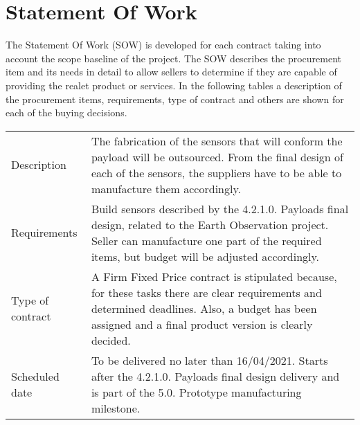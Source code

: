 \section{Statement Of Work}
The Statement Of Work (SOW) is developed for each contract taking into account the scope baseline of the project. The SOW describes the procurement item and its needs in detail to allow sellers to determine if they are capable of providing the realet product or services.
In the following tables a description of the procurement items, requirements, type of contract and others are shown for each of the buying decisions.
\begin{table}[H]
	\centering
	\begin{tabular}{>{\raggedright\arraybackslash}p{3cm} >{\arraybackslash}p{11cm}}
		
		\toprule[2pt]
		
		\multicolumn{2}{c}{\textbf{SOW - 5.1.1. Manufacturing of payload sensors}}\\
		
		\midrule[1.5pt]
		
		Description & The fabrication of the sensors that will conform the payload will be outsourced. From the final design of each of the sensors, the suppliers have to be able to manufacture them accordingly.\vspace{0.2cm} \\
		
		\midrule
		
		Requirements & Build sensors described by the 4.2.1.0. Payloads final design, related to the Earth Observation project. Seller can manufacture one part of the required items, but budget will be adjusted accordingly.\vspace{0.2cm} \\
		
		\midrule
		
		Type of contract & A Firm Fixed Price contract is stipulated because, for these tasks there are clear requirements and determined deadlines. Also, a budget has been assigned and a final product version is clearly decided.\vspace{0.2cm} \\
		
		\midrule
		
		Scheduled date & To be delivered no later than 16/04/2021. Starts after the 4.2.1.0. Payloads final design delivery and is part of the 5.0. Prototype manufacturing milestone.\vspace{0.2cm} \\
		

\end{tabular}
\end{table}
